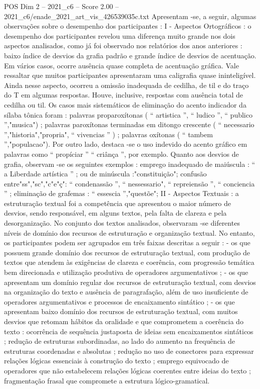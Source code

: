 \begin{textsample}{POS Dim 2 – 2021\_c6 – Score 2.00 – 2021\_c6/enade\_2021\_art\_vis\_426539035c.txt}
Apresentam -se, a seguir, algumas observações sobre o desempenho dos participantes : I - Aspectos Ortográficos : o desempenho dos participantes revelou uma diferença muito grande nos dois aspectos analisados, como já foi observado nos relatórios dos anos anteriores : baixo índice de desvios da grafia padrão e grande índice de desvios de acentuação.
Em vários casos, ocorre ausência quase completa de acentuação gráfica.
Vale ressaltar que muitos participantes apresentaram uma caligrafia quase ininteligível.
Ainda nesse aspecto, ocorreu a omissão inadequada de cedilha, de til e do traço do T em algumas respostas.
Houve, inclusive, respostas com ausência total de cedilha ou til.
Os casos mais sistemáticos de eliminação do acento indicador da sílaba tônica foram : palavras proparoxítonas ( “ artistica ”, “ ludico ”, “ publico ”,"musica") ; palavras paroxítonas terminadas em ditongo crescente ( “ necessario ”,"historia","propria", “ vivencias ” ) ; palavras oxítonas ( “ tambem ”,"populacao").
Por outro lado, destaca -se o uso indevido do acento gráfico em palavras como “ propíciar ” “ criânça ”, por exemplo.
Quanto aos desvios de grafia, observam -se os seguintes exemplos : emprego inadequado de maiúscula : “ a Liberdade artística ” ; ou de minúscula :"constituição"; confusão entre"ss","sc","c"e"ç": “ condenassão ”, “ nessessario", “ repreiensão ”, “ conciencia ” ; eliminação de grafemas : “ essescia ”,"questõe"; II - Aspectos Textuais : a estruturação textual foi a competência que apresentou o maior número de desvios, sendo responsável, em alguns textos, pela falta de clareza e pela desorganização.
No conjunto dos textos analisados, observaram -se diferentes níveis de domínio dos recursos de estruturação e organização textual.
No entanto, os participantes podem ser agrupados em três faixas descritas a seguir : - os que possuem grande domínio dos recursos de estruturação textual, com produção de textos que atendem às exigências de clareza e coerência, com progressão temática bem direcionada e utilização produtiva de operadores argumentativos ; - os que apresentam um domínio regular dos recursos de estruturação textual, com desvios na organização do texto e ausência de paragrafação, além de uso insuficiente de operadores argumentativos e processos de encaixamento sintático ; - os que apresentam baixo domínio dos recursos de estruturação textual, com muitos desvios que retomam hábitos da oralidade e que comprometem a coerência do texto : ocorrência de sequência justaposta de ideias sem encaixamentos sintáticos ; redução de estruturas subordinadas, ao lado do aumento na frequência de estruturas coordenadas e absolutas ; redução no uso de conectores para expressar relações lógicas essenciais à construção do texto ; emprego equivocado de operadores que não estabelecem relações lógicas coerentes entre ideias do texto ; fragmentação frasal que compromete a estrutura lógico-gramatical.

\end{textsample}
